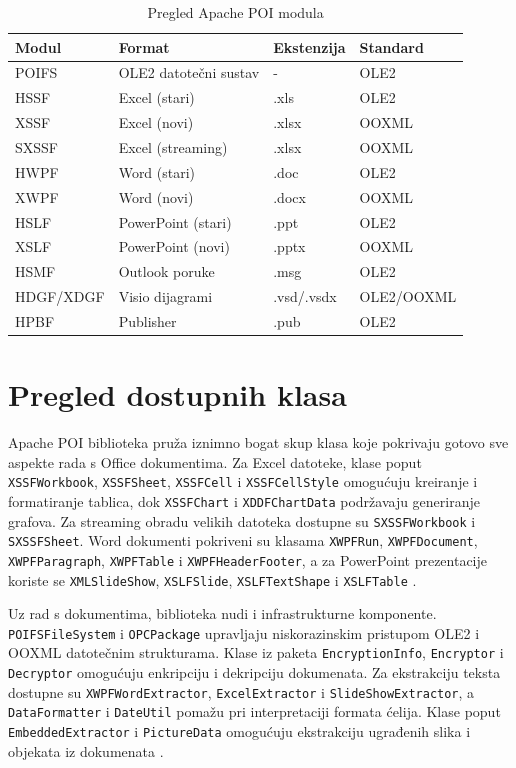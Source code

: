 \documentclass[]{foi}
\begin{document}
\begin{table}[H]
\centering
\caption{Pregled Apache POI modula}
\label{tab:poi-moduli}
\begin{tabular}{llll}
\toprule
\textbf{Modul} & \textbf{Format} & \textbf{Ekstenzija} & \textbf{Standard} \\
\midrule
POIFS & OLE2 datotečni sustav &- & OLE2 \\
HSSF & Excel (stari) & .xls & OLE2 \\
XSSF & Excel (novi) & .xlsx & OOXML \\
SXSSF & Excel (streaming) & .xlsx & OOXML \\
HWPF & Word (stari) & .doc & OLE2 \\
XWPF & Word (novi) & .docx & OOXML \\
HSLF & PowerPoint (stari) & .ppt & OLE2 \\
XSLF & PowerPoint (novi) & .pptx & OOXML \\
HSMF & Outlook poruke & .msg & OLE2 \\
HDGF/XDGF & Visio dijagrami & .vsd/.vsdx & OLE2/OOXML \\
HPBF & Publisher & .pub & OLE2 \\
\bottomrule
\end{tabular}
\end{table}

\section{Pregled dostupnih klasa}

Apache POI biblioteka pruža iznimno bogat skup klasa koje pokrivaju gotovo sve aspekte rada s Office dokumentima. Za Excel datoteke, klase poput \texttt{XSSFWorkbook}, \texttt{XSSFSheet}, \texttt{XSSFCell} i \texttt{XSSFCellStyle} omogućuju kreiranje i formatiranje tablica, dok \texttt{XSSFChart} i \texttt{XDDFChartData} podržavaju generiranje grafova. Za streaming obradu velikih datoteka dostupne su \texttt{SXSSFWorkbook} i \texttt{SXSSFSheet}. Word dokumenti pokriveni su klasama \texttt{XWPFRun}, \texttt{XWPFDocument}, \texttt{XWPFParagraph}, \texttt{XWPFTable} i \texttt{XWPFHeaderFooter}, a za PowerPoint prezentacije koriste se \texttt{XMLSlideShow}, \texttt{XSLFSlide}, \texttt{XSLFTextShape} i \texttt{XSLFTable} \cite{apachePOIJavadoc}.

Uz rad s dokumentima, biblioteka nudi i infrastrukturne komponente. \texttt{POIFSFileSystem} i \texttt{OPCPackage} upravljaju niskorazinskim pristupom OLE2 i OOXML datotečnim strukturama. Klase iz paketa \texttt{EncryptionInfo}, \texttt{Encryptor} i \texttt{Decryptor} omogućuju enkripciju i dekripciju dokumenata. Za ekstrakciju teksta dostupne su \texttt{XWPFWordExtractor}, \texttt{ExcelExtractor} i \texttt{SlideShowExtractor}, a \texttt{DataFormatter} i \texttt{DateUtil} pomažu pri interpretaciji formata ćelija. Klase poput \texttt{EmbeddedExtractor} i \texttt{PictureData} omogućuju ekstrakciju ugrađenih slika i objekata iz dokumenata \cite{apachePOIJavadoc}.
\end{document}
